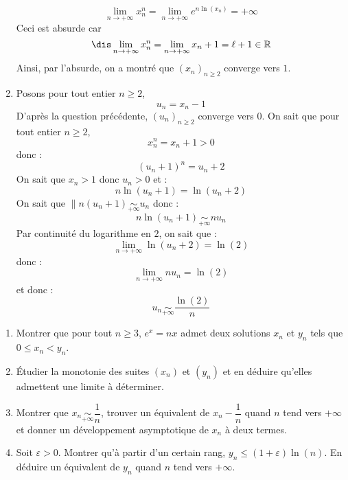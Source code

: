 \documentclass[a4paper,10pt]{report}
\begin{document}
\begin{enumerate}
\[ \lim_{n \rightarrow + \infty} x_n^n = \lim_{n \rightarrow + \infty} e^{n \ln(x_n)} = + \infty \]
Ceci est absurde car 
$$\dis \lim_{n \rightarrow + \infty} x_n^n = \lim_{n \rightarrow + \infty} x_n + 1 = \ell + 1 \in \mathbb{R}$$
Ainsi, par l'absurde, on a montré que $(x_n)_{n \geq 2}$ converge vers $1$.
\item Posons pour tout entier $n \geq 2$, 
$$ u_n = x_n -1$$
D'après la question précédente, $(u_n)_{n \geq 2}$ converge vers $0$.  On sait que pour tout entier $n \geq 2$,
$$ x_n^n = x_n + 1 >0$$
donc :
$$ (u_n+1)^n = u_n +2 $$
On sait que $x_n>1$ donc $u_n>0$ et :
$$ n \ln(u_n + 1) = \ln(u_n+2)$$
On sait que $\|n(u_n+1) \underset{+ \infty}{\sim} u_n$ donc :
$$ n \ln(u_n + 1) \underset{+ \infty}{\sim} nu_n$$
Par continuité du logarithme en $2$, on sait que :
$$ \lim_{n \rightarrow + \infty} \ln(u_n+2) = \ln(2)$$
donc :
$$ \lim_{n \rightarrow + \infty} n u_n = \ln(2)$$
et donc :
$$ u_n \underset{+ \infty}{\sim} \dfrac{\ln(2)}{n}$$
\end{enumerate}




\begin{Exa} \begin{enumerate}
\item Montrer que pour tout $n \geq 3$, $e^x=nx$ admet deux solutions $x_n$ et $y_n$ tels que $0 \leq x_n <y_n$.
\item Étudier la monotonie des suites $(x_n)$ et $(y_n)$ et en déduire qu'elles admettent une limite à déterminer.
\item Montrer que $x_n \underset{+ \infty}{\sim} \dfrac{1}{n}$, trouver un équivalent de $x_n - \dfrac{1}{n}$ quand $n$ tend vers $+ \infty$ et donner un développement asymptotique de $x_n$ à deux termes.
\item Soit $\varepsilon >0$. Montrer qu'à partir d'un certain rang, $y_n \leq (1+ \varepsilon) \ln(n)$. En déduire un équivalent de $y_n$ quand $n$ tend vers $+ \infty$.
\end{enumerate}
\end{Exa}
\end{document}
